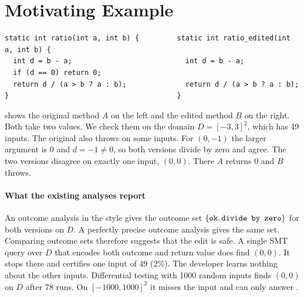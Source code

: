 \section{Motivating Example}
\label{sec:example}

\begin{lstlisting}[float, label=lst:example, caption={A faulty guard removal from our corpus (\code{Refactorings.ratio}). The edit deletes line 3.}]
static int ratio(int a, int b) {         static int ratio_edited(int a, int b) {
  int d = b - a;                           int d = b - a;
  if (d == 0) return 0;
  return d / (a > b ? a : b);              return d / (a > b ? a : b);
}                                        }
\end{lstlisting}

 shows the original method $A$ on the left and the edited method $B$ on the
right. Both take two  values. We check them on the domain $D = [-3,3]^2$, which has 49
inputs. The original also throws on some inputs. For $(0,-1)$ the larger argument is $0$ and
$d = -1 \neq 0$, so both versions divide by zero and agree. The two versions disagree on
exactly one input, $(0,0)$. There $A$ returns $0$ and $B$ throws.

\paragraph{What the existing analyses report}
An outcome analysis in the \jpamb{} style gives the outcome set $\left\{\texttt{ok}, \texttt{divide by zero}\right\}$ for both
versions on $D$. A perfectly precise outcome analysis gives the same set. Comparing outcome
sets therefore suggests that the edit is safe. A single SMT query over $D$ that encodes both
outcome and return value does find $(0,0)$. It stops there and certifies one input of 49
(2\%). The developer learns nothing about the other inputs. Differential testing with 1000
random inputs finds $(0,0)$ on $D$ after 78 runs. On $[-1000,1000]^2$ it misses the input and
can only answer \unk{}.

